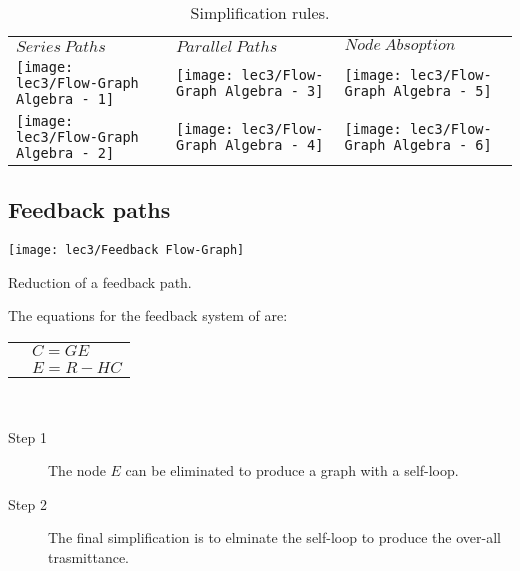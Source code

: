 

\begin{table}[!h]
	\begin{tabular}{>{\centering\arraybackslash}m{3.5cm} | >{\centering\arraybackslash}m{3.5cm} | >{\centering\arraybackslash}m{3.5cm}}
	       \small $Series\ Paths$ &\small $Parallel\ Paths$ &\small $Node\ Absoption$\\[+1mm]
	       \texttt{[image: lec3/Flow-Graph Algebra - 1]}&
	       \texttt{[image: lec3/Flow-Graph Algebra - 3]}&
	       \texttt{[image: lec3/Flow-Graph Algebra - 5]}\\
	       \texttt{[image: lec3/Flow-Graph Algebra - 2]}&
	       \texttt{[image: lec3/Flow-Graph Algebra - 4]}&
	       \texttt{[image: lec3/Flow-Graph Algebra - 6]}\\
	\end{tabular}
	\caption{Simplification rules.}
\end{table}

\justify
\subsection{Feedback paths}

\begin{marginfigure}[-0.4233401538135892cm]
		\texttt{[image: lec3/Feedback Flow-Graph]}
		\caption{Reduction of a feedback path.}
\end{marginfigure}

The equations for the feedback system of  are:\\
\begin{tabular}{p{8cm}p{2cm}}
	&$C=GE$\\
	&$E=R-HC$\\
\end{tabular}
\\
\begin{description}
	\item[Step 1]  The node $E$ can be eliminated to produce a graph with a self-loop.\\[+2.65em]
	\item[Step 2]  The final simplification is to elminate the self-loop to produce the over-all trasmittance.
\end{description}


